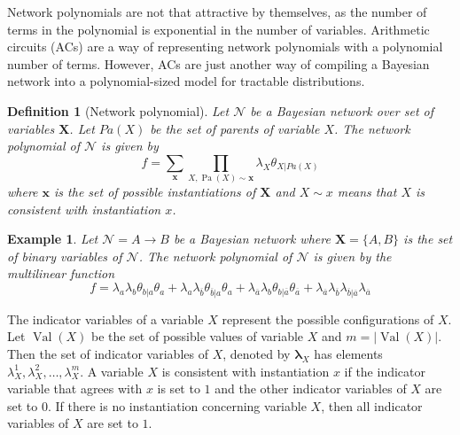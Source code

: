 \documentclass{amsart}
\DeclareMathOperator*{\Val}{\text{Val}}
\DeclareMathOperator*{\Pa}{\text{Pa}}
\newcommand{\ov}{\overline}
\theoremstyle{plain}
\newcounter{dummy-def}\numberwithin{dummy-def}{section}
\newtheorem{definition}[dummy-def]{Definition}
\newcounter{dummy-thm}\numberwithin{dummy-thm}{section}
\newcounter{dummy-prop}\numberwithin{dummy-prop}{section}
\newcounter{dummy-ex}\numberwithin{dummy-ex}{section}
\newcounter{dummy-eg}\numberwithin{dummy-eg}{section}
\newtheorem{example}[dummy-eg]{Example}
\numberwithin{equation}{section}
\begin{document}
Network polynomials are not that attractive by themselves, as the number of terms in the polynomial
is exponential in the number of variables. Arithmetic circuits (ACs) are a way of representing
network polynomials with a polynomial number of terms. However, ACs are just another way of
compiling a Bayesian network into a polynomial-sized model for tractable distributions.

\begin{definition}[Network polynomial] Let $\mathcal{N}$ be a Bayesian network over set of
  variables $\mathbf{X}$. Let $Pa(X)$ be the set of parents of variable $X$. The network polynomial
  of $\mathcal{N}$ is given by
  \begin{equation*}
    f=\sum_{\mathbf{x}} \prod_{X, \Pa(X) \sim \mathbf{x}} \lambda_X \theta_{X|Pa(X)}
  \end{equation*}
  where $\mathbf{x}$ is the set of possible instantiations of $\mathbf{X}$ and $X \sim x$ means
  that $X$ is consistent with instantiation $x$.
\end{definition}

\begin{example}
  Let $\mathcal{N}=A\to B$ be a Bayesian network where $\mathbf{X}=\{A, B\}$ is the set of binary
  variables of $\mathcal{N}$. The network polynomial of $\mathcal{N}$ is given by the multilinear
  function
  \begin{equation*}
    f=\lambda_a\lambda_b\theta_{b|a}\theta_{a}+\lambda_a\lambda_{\ov{b}}\theta_{\ov{b}|a}\theta_a+
    \lambda_{\ov{a}}\lambda_b\theta_{b|\ov{a}}\theta_{\ov{a}}+\lambda_{\ov{a}}\lambda_{\ov{b}}
    \lambda_{\ov{b}|\ov{a}}\lambda_{\ov{a}}
  \end{equation*}
\end{example}

The indicator variables of a variable $X$ represent the possible configurations of $X$. Let
$\Val(X)$ be the set of possible values of variable $X$ and $m=|\Val(X)|$. Then the set of
indicator variables of $X$, denoted by $\boldsymbol{\lambda}_X$ has elements $\lambda_X^1,
\lambda_X^2,\ldots,\lambda_X^m$. A variable $X$ is consistent with instantiation $x$ if the
indicator variable that agrees with $x$ is set to $1$ and the other indicator variables of $X$ are
set to $0$. If there is no instantiation concerning variable $X$, then all indicator variables of
$X$ are set to $1$.
\end{document}
